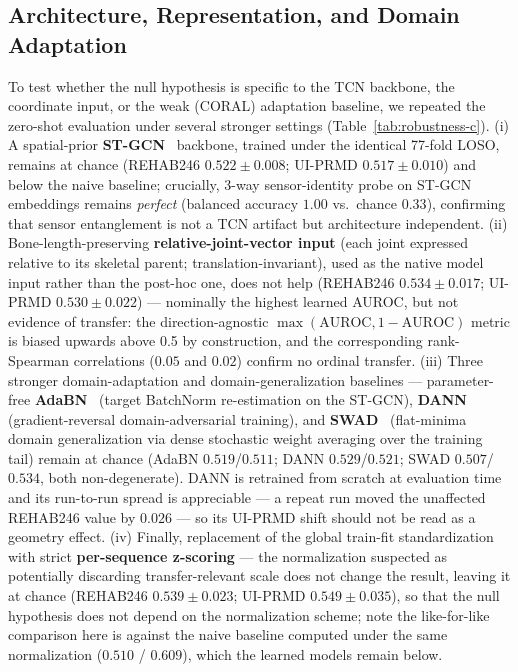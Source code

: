 \documentclass[10pt,journal]{IEEEtran}
\begin{document}
\subsection{Architecture, Representation, and Domain Adaptation}
\label{sec:robustness-c}
To test whether the null hypothesis is specific to the TCN backbone, the coordinate input, or the weak (CORAL) adaptation baseline, we repeated the zero-shot evaluation under several stronger settings (Table~\ref{tab:robustness-c}). (i) A spatial-prior \textbf{ST-GCN}~\cite{yan2018stgcn} backbone, trained under the identical 77-fold LOSO, remains at chance (REHAB246 $0.522\pm0.008$; UI-PRMD $0.517\pm0.010$) and below the naive baseline; crucially, 3-way sensor-identity probe on ST-GCN embeddings remains \emph{perfect} (balanced accuracy $1.00$ vs.\ chance $0.33$), confirming that sensor entanglement is not a TCN artifact but architecture independent. (ii) Bone-length-preserving \textbf{relative-joint-vector input} (each joint expressed relative to its skeletal parent; translation-invariant), used as the native model input rather than the post-hoc one, does not help (REHAB246 $0.534\pm0.017$; UI-PRMD $0.530\pm0.022$) --- nominally the highest learned AUROC, but not evidence of transfer: the direction-agnostic $\max(\text{AUROC}, 1-\text{AUROC})$ metric is biased upwards above 0.5 by construction, and the corresponding rank-Spearman correlations ($0.05$ and $0.02$) confirm no ordinal transfer. (iii) Three stronger domain-adaptation and domain-generalization baselines --- parameter-free \textbf{AdaBN}~\cite{li2018adabn} (target BatchNorm re-estimation on the ST-GCN), \textbf{DANN}~\cite{ganin2016dann} (gradient-reversal domain-adversarial training), and \textbf{SWAD}~\cite{cha2021swad} (flat-minima domain generalization via dense stochastic weight averaging over the training tail) remain at chance (AdaBN $0.519$/$0.511$; DANN $0.529$/$0.521$; SWAD $0.507$/$0.534$, both non-degenerate). DANN is retrained from scratch at evaluation time and its run-to-run spread is appreciable --- a repeat run moved the unaffected REHAB246 value by $0.026$ --- so its UI-PRMD shift should not be read as a geometry effect. (iv) Finally, replacement of the global train-fit standardization with strict \textbf{per-sequence z-scoring} --- the normalization suspected as potentially discarding transfer-relevant scale does not change the result, leaving it at chance (REHAB246 $0.539\pm0.023$; UI-PRMD $0.549\pm0.035$), so that the null hypothesis does not depend on the normalization scheme; note the like-for-like comparison here is against the naive baseline computed under the same normalization ($0.510$ / $0.609$), which the learned models remain below.
\end{document}
